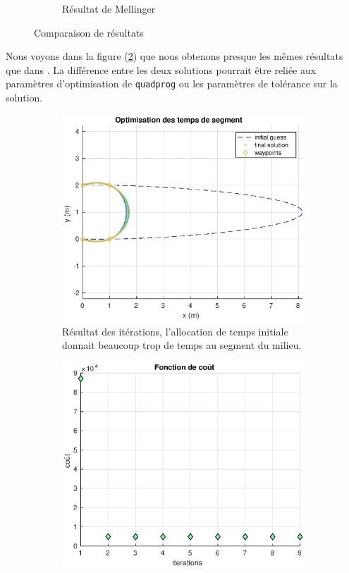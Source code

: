 \begin{figure}[h]
\begin{subfigure}{.5\textwidth}
  \caption{Résultat de Mellinger \cite{Mellinger2011}}
  \label{fig:sub2}
\end{subfigure}
\caption{Comparaison de résultats}
\label{fig:comparaison}
\end{figure}

Nous voyons dans la figure (\ref{fig:comparaison}) que nous obtenons presque les mêmes résultats que dans \cite{Mellinger2011}. La différence entre les deux solutions pourrait  être reliée aux paramètres d'optimisation de \texttt{quadprog} ou les paramètres de tolérance sur la solution.

\begin{figure}[h]
\centering
\begin{subfigure}{.5\textwidth}
  \centering
  \includegraphics[width=1.2\textwidth]{fig/arc_time_opt}
  \caption{Résultat des itérations, l'allocation de temps initiale donnait beaucoup trop de temps au segment du milieu.}
\end{subfigure}%
\begin{subfigure}{.5\textwidth}
  \centering
  \includegraphics[width=\textwidth]{fig/cost}

\end{subfigure}
\end{figure}
